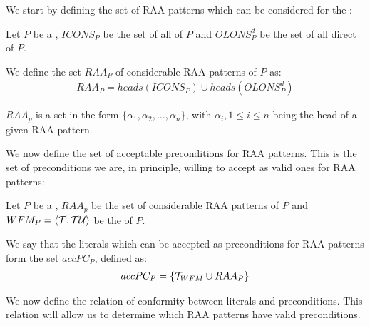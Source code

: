 We start by defining the set of RAA patterns which can be considered for the \rwfs:

\begin{definition}
Let $P$ be a \nlp, $ICONS_{P}$ be the set of all \icons of $P$ and $OLONS_{P}^{d}$ be the set of all direct \olons of $P$. 

We define the set $RAA_{P}$ of considerable RAA patterns of $P$ as:
\begin{align*}
RAA_{P} = heads(ICONS_{P}) \cup heads(OLONS_{P}^{d})
\end{align*}

$RAA_{p}$ is a set in the form $\{\alpha_{1},\alpha_{2},\ldots,\alpha_{n}\}$, with $\alpha_{i}, 1\leq i\leq n$ being the head of a given RAA pattern.
\end{definition}

We now define the set of acceptable preconditions for RAA patterns. This is the set of preconditions we are, in principle, willing to accept as valid ones for RAA patterns:

\begin{definition}
Let $P$ be a \nlp, $RAA_{p}$ be the set of considerable RAA patterns of $P$ and $WFM_{P}=\langle \cal{T},\cal{TU} \rangle$ be the \wfm of $P$.

We say that the literals which can be accepted as preconditions for RAA patterns form the set $accPC_{P}$, defined as:
\begin{align*}
accPC_{P} = \{{\cal{T}}_{WFM}\cup RAA_{P}\}
\end{align*}
\end{definition}

We now define the relation of conformity between literals and preconditions. This relation will allow us to determine which RAA patterns have valid preconditions.

